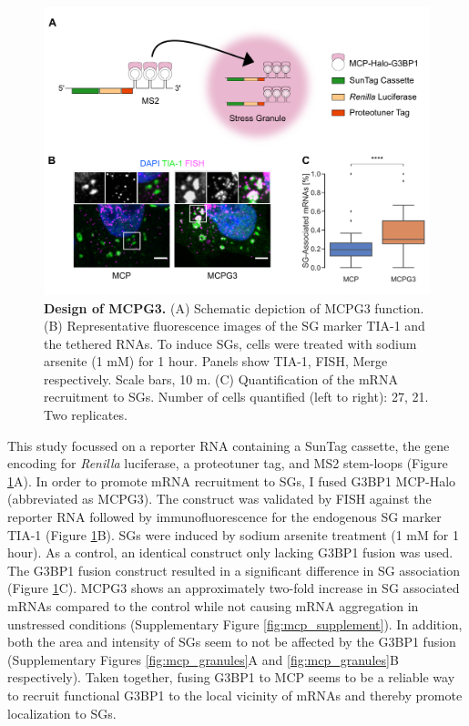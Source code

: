 \begin{figure}[b!]
    \centering
    \includegraphics[width=\linewidth]{images/figure2}
    \caption{\textbf{Design of MCPG3.}
        (A) Schematic depiction of MCPG3 function.
        (B) Representative fluorescence images of the SG marker
            TIA-1 and the tethered RNAs.
            To induce SGs, cells were treated with sodium arsenite (1 mM) for 1 hour.
            Panels show TIA-1, FISH, Merge respectively.
            Scale bars, 10 \textmu m.
        (C) Quantification of the mRNA recruitment to SGs.
            Number of cells quantified (left to right): 27, 21. Two replicates.
    }
    \label{fig:mcp_images}
\end{figure}

This study focussed on a reporter RNA containing a SunTag cassette, the gene encoding for \textit{Renilla} luciferase, a proteotuner tag, and MS2 stem-loops (Figure \ref{fig:mcp_images}A).
In order to promote mRNA recruitment to SGs, I fused G3BP1 MCP-Halo (abbreviated as MCPG3).
The construct was validated by FISH against the reporter RNA followed by immunofluorescence for the endogenous SG marker TIA-1 \cite{kedersha_rna-binding_1999} (Figure \ref{fig:mcp_images}B).
SGs were induced by sodium arsenite treatment (1 mM for 1 hour).
As a control, an identical construct only lacking G3BP1 fusion was used.
The G3BP1 fusion construct resulted in a significant difference in SG association (Figure \ref{fig:mcp_images}C).
MCPG3 shows an approximately two-fold increase in SG associated mRNAs compared to the control while not causing mRNA aggregation in unstressed conditions (Supplementary Figure \ref{fig:mcp_supplement}).
In addition, both the area and intensity of SGs seem to not be affected by the G3BP1 fusion (Supplementary Figures \ref{fig:mcp_granules}A and \ref{fig:mcp_granules}B respectively).
Taken together, fusing G3BP1 to MCP seems to be a reliable way to recruit functional G3BP1 to the local vicinity of mRNAs and thereby promote localization to SGs.


